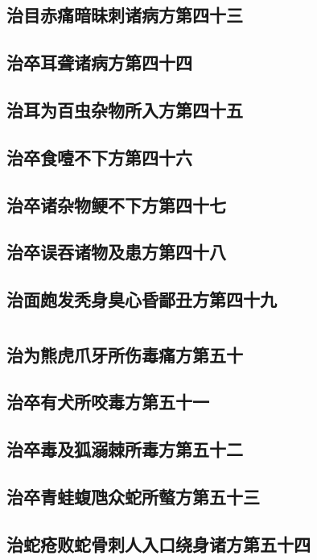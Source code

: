 \documentclass[12pt,UTF8]{ctexbook}
\begin{document}
\chapter{治目赤痛暗昧刺诸病方第四十三}
\chapter{治卒耳聋诸病方第四十四}
\chapter{治耳为百虫杂物所入方第四十五}
\chapter{治卒食噎不下方第四十六}
\chapter{治卒诸杂物鲠不下方第四十七}
\chapter{治卒误吞诸物及患方第四十八}
\chapter{治面皰发秃身臭心昏鄙丑方第四十九}

\part{}

\chapter{治为熊虎爪牙所伤毒痛方第五十}
\chapter{治卒有犬所咬毒方第五十一}
\chapter{治卒毒及狐溺棘所毒方第五十二}
\chapter{治卒青蛙蝮虺众蛇所螫方第五十三}
\chapter{治蛇疮败蛇骨刺人入口绕身诸方第五十四}
\end{document}
